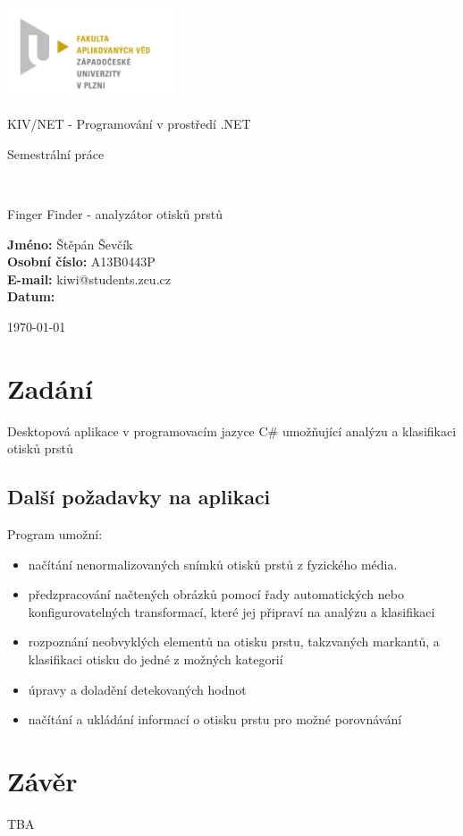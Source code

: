 \documentclass[12pt,a4paper]{article}
\author{Jan Šmejkal}
\let\oldsection\section
\renewcommand\section{\clearpage\oldsection}
\begin{document}
\begin{titlepage}

\includegraphics[width=50mm]{img/FAV.jpg}
\\[160 pt]
\centerline{ \Huge \sc KIV/NET - Programování v prostředí .NET}
\centerline{ \huge \sc Semestrální práce }
\\[12 pt]
{\large \sc
\centerline{Finger Finder - analyzátor otisků prstů}
}


{
\vfill 
\parindent=0cm
\textbf{Jméno:} Štěpán Ševčík\\
\textbf{Osobní číslo:} A13B0443P\\
\textbf{E-mail:} kiwi@students.zcu.cz\\
\textbf{Datum:} {\large \today\par} %

}

\end{titlepage}


\newpage
\setcounter{page}{2}
\setcounter{tocdepth}{3}
\tableofcontents

\section{Zadání}
Desktopová aplikace v programovacím jazyce C\# umožňující analýzu a klasifikaci otisků prstů
\subsection{Další požadavky na aplikaci}

Program umožní: 
\begin{itemize}
\item načítání nenormalizovaných snímků otisků prstů z fyzického média.
\item předzpracování načtených obrázků pomocí řady automatických nebo konfigurovatelných transformací, které jej připraví na analýzu a klasifikaci
\item rozpoznání neobvyklých elementů na otisku prstu, takzvaných markantů, a klasifikaci otisku do jedné z možných kategorií
\item úpravy a doladění detekovaných hodnot
\item načítání a ukládání informací o otisku prstu pro možné porovnávání
\end{itemize}


\section{Závěr}
TBA


\end{document}
